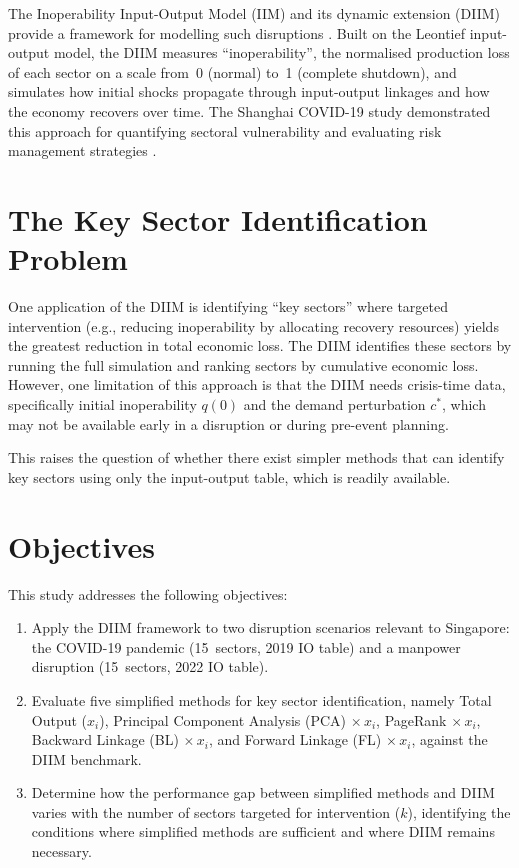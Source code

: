 The Inoperability Input-Output Model (IIM) and its dynamic extension (DIIM) provide a framework for modelling such disruptions \cite{SantosHaimes2004}. Built on the Leontief input-output model, the DIIM measures ``inoperability'', the normalised production loss of each sector on a scale from~0 (normal) to~1 (complete shutdown), and simulates how initial shocks propagate through input-output linkages and how the economy recovers over time. The Shanghai COVID-19 study demonstrated this approach for quantifying sectoral vulnerability and evaluating risk management strategies \cite{JinZhou2023}.

\section{The Key Sector Identification Problem}

One application of the DIIM is identifying ``key sectors'' where targeted intervention (e.g., reducing inoperability by allocating recovery resources) yields the greatest reduction in total economic loss. The DIIM identifies these sectors by running the full simulation and ranking sectors by cumulative economic loss. However, one limitation of this approach is that the DIIM needs crisis-time data, specifically initial inoperability $q(0)$ and the demand perturbation $c^{*}$, which may not be available early in a disruption or during pre-event planning.

This raises the question of whether there exist simpler methods that can identify key sectors using only the input-output table, which is readily available.

\section{Objectives}

This study addresses the following objectives:

\begin{enumerate}
    \item Apply the DIIM framework to two disruption scenarios relevant to Singapore: the COVID-19 pandemic (15~sectors, 2019 IO table) and a manpower disruption (15~sectors, 2022 IO table).
    \item Evaluate five simplified methods for key sector identification, namely Total Output ($x_i$), Principal Component Analysis (PCA) $\times\, x_i$, PageRank $\times\, x_i$, Backward Linkage (BL) $\times\, x_i$, and Forward Linkage (FL) $\times\, x_i$, against the DIIM benchmark.
    \item Determine how the performance gap between simplified methods and DIIM varies with the number of sectors targeted for intervention ($k$), identifying the conditions where simplified methods are sufficient and where DIIM remains necessary.
\end{enumerate}

